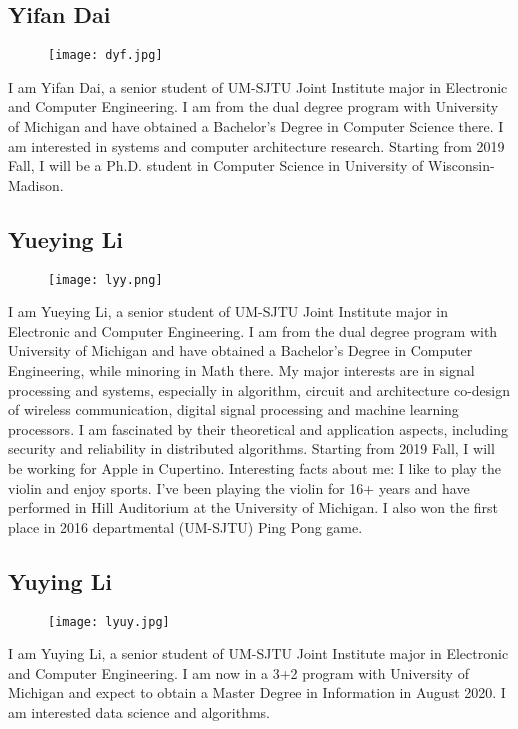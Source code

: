\subsection{Yifan Dai}
\begin{figure}[htbp]
  \centering \texttt{[image: dyf.jpg]}
  \label{fig:dyf}
\end{figure}
I am Yifan Dai, a senior student of UM-SJTU Joint Institute major in Electronic and Computer Engineering. I am from the dual degree program with University of Michigan and have obtained a Bachelor's Degree in Computer Science there. I am interested in systems and computer architecture research. Starting from 2019 Fall, I will be a Ph.D. student in Computer Science in University of Wisconsin-Madison.

\subsection{Yueying Li}
\begin{figure}[htbp]
  \centering \texttt{[image: lyy.png]}
  \label{fig:lyy}
\end{figure}
I am Yueying Li, a senior student of UM-SJTU Joint Institute major in Electronic and Computer Engineering. I am from the dual degree program with University of Michigan and have obtained a Bachelor's Degree in Computer Engineering, while minoring in Math there. My major interests are in signal processing and systems, especially in algorithm, circuit and architecture co-design of wireless communication, digital signal processing and machine learning processors. I am fascinated by their theoretical and application aspects, including security and reliability in distributed algorithms. Starting from 2019 Fall, I will be working for Apple in Cupertino.
Interesting facts about me: I like to play the violin and enjoy sports. I've been playing the violin for 16+ years and have performed in Hill Auditorium at the University of Michigan. I also won the first place in 2016 departmental (UM-SJTU) Ping Pong game. 

\subsection{Yuying Li}
\begin{figure}[htbp]
  \centering \texttt{[image: lyuy.jpg]}
  \label{fig:lyuy}
\end{figure}
I am Yuying Li, a senior student of UM-SJTU Joint Institute major in Electronic and Computer Engineering. I am now in a 3+2 program with University of Michigan and expect to obtain a Master Degree in Information in August 2020. I am interested data science and algorithms.


